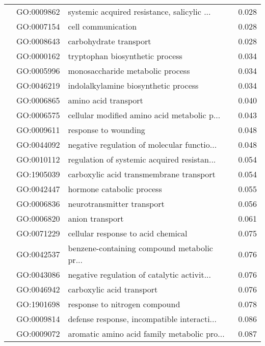 \begin{longtable}{lllr}
   & GO:0009862 &  systemic acquired resistance, salicylic ... &         0.028 \\
   & GO:0007154 &                           cell communication &         0.028 \\
   & GO:0008643 &                       carbohydrate transport &         0.028 \\
   & GO:0000162 &              tryptophan biosynthetic process &         0.034 \\
   & GO:0005996 &             monosaccharide metabolic process &         0.034 \\
   & GO:0046219 &         indolalkylamine biosynthetic process &         0.034 \\
   & GO:0006865 &                         amino acid transport &         0.040 \\
   & GO:0006575 &  cellular modified amino acid metabolic p... &         0.043 \\
   & GO:0009611 &                         response to wounding &         0.048 \\
   & GO:0044092 &  negative regulation of molecular functio... &         0.048 \\
   & GO:0010112 &  regulation of systemic acquired resistan... &         0.054 \\
   & GO:1905039 &      carboxylic acid transmembrane transport &         0.054 \\
   & GO:0042447 &                    hormone catabolic process &         0.055 \\
   & GO:0006836 &                   neurotransmitter transport &         0.056 \\
   & GO:0006820 &                              anion transport &         0.061 \\
   & GO:0071229 &           cellular response to acid chemical &         0.075 \\
   & GO:0042537 &  benzene-containing compound metabolic pr... &         0.076 \\
   & GO:0043086 &  negative regulation of catalytic activit... &         0.076 \\
   & GO:0046942 &                    carboxylic acid transport &         0.076 \\
   & GO:1901698 &                response to nitrogen compound &         0.078 \\
   & GO:0009814 &  defense response, incompatible interacti... &         0.086 \\
   & GO:0009072 &  aromatic amino acid family metabolic pro... &         0.087 \\

\end{longtable}
